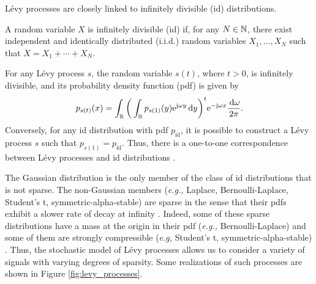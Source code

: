 \documentclass[journal]{IEEEtran}
\begin{document}
L\'{e}vy processes are closely linked to infinitely divisible (id) distributions. 

\begin{definition}
    A random variable $X$ is infinitely divisible (id) if, for any $N \in \mathbb{N}$, there exist independent and identically distributed (i.i.d.) random variables $X_1, \ldots, X_N$ such that $X = X_1 + \cdots + X_N$. 
\end{definition}

For any L\'{e}vy process $s$, the random variable $s(t)$, where $t>0$, is infinitely divisible, and its probability density function (pdf) is given by
\begin{equation}
    p_{s(t)}(x) = \int_{\mathbb{R}} \bigg(\int_{\mathbb{R}} p_{s(1)}(y) \mathrm{e}^{\mathrm{j} \omega y} \,\mathrm{d} y \bigg)^t \mathrm{e}^{-\mathrm{j} \omega x} \frac{\,\mathrm{d} \omega}{2\pi}. 
\end{equation}  
Conversely, for any id distribution with pdf $p_{\text{id}}$, it is possible to construct a L\'{e}vy process $s$ such that $p_{s(1)} = p_{\text{id}}$. Thus, there is a one-to-one correspondence between L\'{e}vy processes and id distributions \cite{ken1999levy}. 

The Gaussian distribution is the only member of the class of id distributions that is not sparse. The non-Gaussian members (\textit{e.g.,} Laplace, Bernoulli-Laplace, Student's t, symmetric-alpha-stable) are sparse in the sense that their pdfs exhibit a slower rate of decay at infinity \cite{amini2014sparsity}. Indeed, some of these sparse distributions have a mass at the origin in their pdf (\textit{e.g.,} Bernoulli-Laplace) and some of them are strongly compressible (\textit{e.g,} Student's t, symmetric-alpha-stable) \cite{amini2011compressibility}. Thus, the stochastic model of L\'{e}vy processes allows us to consider a variety of signals with varying degrees of sparsity. Some realizations of such processes are shown in Figure \ref{fig:levy_processes}.   
\end{document}

